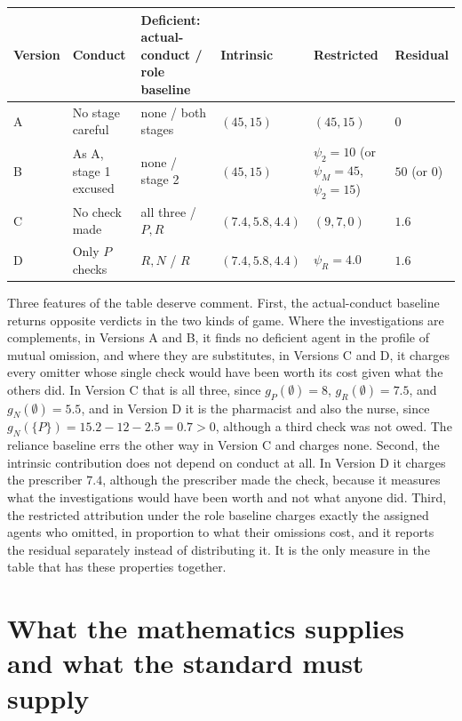 \documentclass[11pt]{article}
\theoremstyle{plain}
\theoremstyle{definition}
\begin{document}
\begin{center}
\small
\begin{tabular}{@{}p{}p{}p{}p{}p{}p{}@{}}
\hline
Version & Conduct & Deficient: actual-conduct / role baseline & Intrinsic & Restricted & Residual\\
\hline
A & No stage careful & none / both stages & $(45,15)$ & $(45,15)$ & $0$\\
B & As A, stage 1 excused & none / stage 2 & $(45,15)$ & $\psi_2=10$ (or $\psi_M=45$, $\psi_2=15$) & $50$ (or $0$)\\
C & No check made & all three / $P,R$ & $(7.4,5.8,4.4)$ & $(9,7,0)$ & $1.6$\\
D & Only $P$ checks & $R,N$ / $R$ & $(7.4,5.8,4.4)$ & $\psi_R=4.0$ & $1.6$\\
\hline
\end{tabular}
\end{center}

Three features of the table deserve comment. First, the actual-conduct baseline returns opposite verdicts in the two kinds of game. Where the investigations are complements, in Versions A and B, it finds no deficient agent in the profile of mutual omission, and where they are substitutes, in Versions C and D, it charges every omitter whose single check would have been worth its cost given what the others did. In Version C that is all three, since $g_P(\emptyset)=8$, $g_R(\emptyset)=7.5$, and $g_N(\emptyset)=5.5$, and in Version D it is the pharmacist and also the nurse, since $g_N(\{P\})=15.2-12-2.5=0.7>0$, although a third check was not owed. The reliance baseline errs the other way in Version C and charges none. Second, the intrinsic contribution does not depend on conduct at all. In Version D it charges the prescriber $7.4$, although the prescriber made the check, because it measures what the investigations would have been worth and not what anyone did. Third, the restricted attribution under the role baseline charges exactly the assigned agents who omitted, in proportion to what their omissions cost, and it reports the residual separately instead of distributing it. It is the only measure in the table that has these properties together.

\section{What the mathematics supplies and what the standard must supply}\label{sec:supply}
\end{document}
